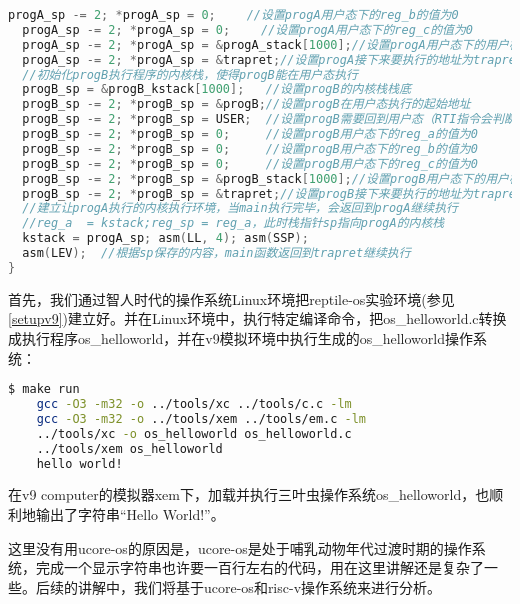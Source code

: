 \begin{lstlisting}[language={C}]
  progA_sp -= 2; *progA_sp = 0; 　　//设置progA用户态下的reg_b的值为0
  progA_sp -= 2; *progA_sp = 0; 　　//设置progA用户态下的reg_c的值为0
  progA_sp -= 2; *progA_sp = &progA_stack[1000];//设置progA用户态下的用户栈
  progA_sp -= 2; *progA_sp = &trapret;//设置progA接下来要执行的地址为trapret  
  //初始化progB执行程序的内核栈，使得progB能在用户态执行  
  progB_sp = &progB_kstack[1000];   //设置progB的内核栈栈底
  progB_sp -= 2; *progB_sp = &progB;//设置progB在用户态执行的起始地址
  progB_sp -= 2; *progB_sp = USER;  //设置progB需要回到用户态（RTI指令会判断）
  progB_sp -= 2; *progB_sp = 0;     //设置progB用户态下的reg_a的值为0
  progB_sp -= 2; *progB_sp = 0;     //设置progB用户态下的reg_b的值为0
  progB_sp -= 2; *progB_sp = 0;     //设置progB用户态下的reg_c的值为0
  progB_sp -= 2; *progB_sp = &progB_stack[1000];//设置progB用户态下的用户栈
  progB_sp -= 2; *progB_sp = &trapret;//设置progB接下来要执行的地址为trapret
  //建立让progA执行的内核执行环境，当main执行完毕，会返回到progA继续执行
  //reg_a  = kstack;reg_sp = reg_a，此时栈指针sp指向progA的内核栈
  kstack = progA_sp; asm(LL, 4); asm(SSP);         
  asm(LEV);  //根据sp保存的内容，main函数返回到trapret继续执行 
}
\end{lstlisting}
 
首先，我们通过智人时代的操作系统Linux环境把reptile-os实验环境(参见\ref{setupv9})建立好。并在Linux环境中，执行特定编译命令，把os\_helloworld.c转换成执行程序os\_helloworld，并在v9模拟环境中执行生成的os\_helloworld操作系统：
\begin{lstlisting}[language={bash}]
	$ make run
	gcc -O3 -m32 -o ../tools/xc ../tools/c.c -lm
	gcc -O3 -m32 -o ../tools/xem ../tools/em.c -lm
	../tools/xc -o os_helloworld os_helloworld.c
	../tools/xem os_helloworld
	hello world!
\end{lstlisting}

在v9 computer的模拟器xem下，加载并执行三叶虫操作系统os\_helloworld，也顺利地输出了字符串“Hello World!”。


\begin{note} 
这里没有用ucore-os的原因是，ucore-os是处于哺乳动物年代过渡时期的操作系统，完成一个显示字符串也许要一百行左右的代码，用在这里讲解还是复杂了一些。后续的讲解中，我们将基于ucore-os和risc-v操作系统来进行分析。
\end{note} 
